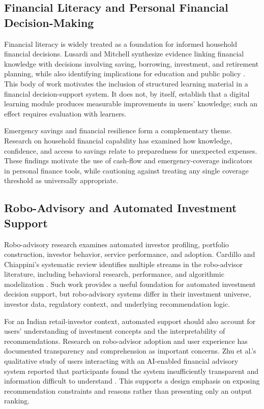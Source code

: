 \subsection{Financial Literacy and Personal Financial Decision-Making}
Financial literacy is widely treated as a foundation for informed household financial decisions. Lusardi and Mitchell synthesize evidence linking financial knowledge with decisions involving saving, borrowing, investment, and retirement planning, while also identifying implications for education and public policy \cite{lusardiMitchell2014,lusardiMitchell2023}. This body of work motivates the inclusion of structured learning material in a financial decision-support system. It does not, by itself, establish that a digital learning module produces measurable improvements in users' knowledge; such an effect requires evaluation with learners.

Emergency savings and financial resilience form a complementary theme. Research on household financial capability has examined how knowledge, confidence, and access to savings relate to preparedness for unexpected expenses. These findings motivate the use of cash-flow and emergency-coverage indicators in personal finance tools, while cautioning against treating any single coverage threshold as universally appropriate.

\subsection{Robo-Advisory and Automated Investment Support}
Robo-advisory research examines automated investor profiling, portfolio construction, investor behavior, service performance, and adoption. Cardillo and Chiappini's systematic review identifies multiple streams in the robo-advisor literature, including behavioral research, performance, and algorithmic modelization \cite{cardilloChiappini2024}. Such work provides a useful foundation for automated investment decision support, but robo-advisory systems differ in their investment universe, investor data, regulatory context, and underlying recommendation logic.

For an Indian retail-investor context, automated support should also account for users' understanding of investment concepts and the interpretability of recommendations. Research on robo-advisor adoption and user experience has documented transparency and comprehension as important concerns. Zhu et al.'s qualitative study of users interacting with an AI-enabled financial advisory system reported that participants found the system insufficiently transparent and information difficult to understand \cite{zhuEtAl2023}. This supports a design emphasis on exposing recommendation constraints and reasons rather than presenting only an output ranking.

